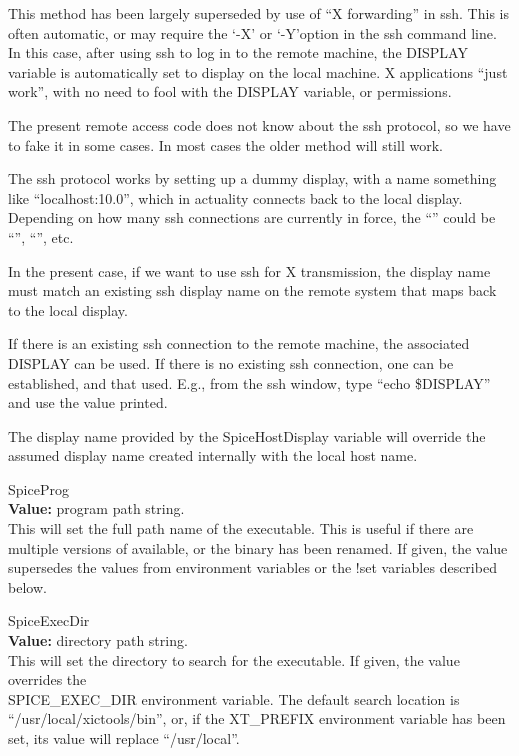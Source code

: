 \begin{description}
This method has been largely superseded by use of ``X forwarding'' in
{\vt ssh}.  This is often automatic, or may require the `{\vt -X}' or
`{\vt -Y}'option in the {\vt ssh} command line.  In this case, after
using {\vt ssh} to log in to the remote machine, the {\et DISPLAY}
variable is automatically set to display on the local machine.  X
applications ``just work'', with no need to fool with the {\et
DISPLAY} variable, or permissions.

The present {\Xic} remote access code does not know about the {\vt
ssh} protocol, so we have to fake it in some cases.  In most cases the
older method will still work.

The {\vt ssh} protocol works by setting up a dummy display, with a
name something like ``{\vt localhost:10.0}'', which in actuality
connects back to the local display.  Depending on how many {\vt ssh}
connections are currently in force, the ``{}'' could be ``{}'', ``{}'', etc.

In the present case, if we want to use {\vt ssh} for X transmission,
the display name must match an existing {\vt ssh} display name on the
remote system that maps back to the local display.

If there is an existing {\vt ssh} connection to the remote machine,
the associated {\et DISPLAY} can be used.  If there is no existing
{\vt ssh} connection, one can be established, and that used.  E.g.,
from the {\vt ssh} window, type ``{\vt echo \$DISPLAY}'' and use the
value printed.

The display name provided by the {\et SpiceHostDisplay} variable will
override the assumed display name created internally with the local
host name.

\item{\et SpiceProg}\\
{\bf Value:} program path string.\\
This will set the full path name of the {\WRspice} executable.  This
is useful if there are multiple versions of {\WRspice} available, or
the binary has been renamed.  If given, the value supersedes the
values from environment variables or the {\cb !set} variables
described below.

\item{\et SpiceExecDir}\\
{\bf Value:} directory path string.\\
This will set the directory to search for the {\WRspice} executable. 
If given, the value overrides the\\ {\et SPICE\_EXEC\_DIR} environment
variable.  The default search location is ``{\vt /usr/local/xictools/bin}'',
or, if the {\et XT\_PREFIX} environment variable has been set, its
value will replace ``{\vt /usr/local}''.


\end{description}
